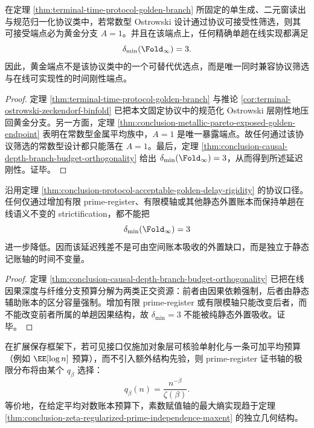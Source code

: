 \begin{theorem}[协议可接受设计的黄金端点延迟刚性]\label{thm:conclusion-protocol-acceptable-golden-delay-rigidity}
在定理 \ref{thm:terminal-time-protocol-golden-branch} 所固定的单生成、二元窗读出与规范归一化协议类中，若常数型 Ostrowski 设计通过协议可接受性筛选，则其可接受端点必为黄金分支 \(A=1\)。并且在该端点上，任何精确单趟在线实现都满足
\[
\delta_{\min}(\Fold_\infty)=3.
\]
因此，黄金端点不是该协议类中的一个可替代优选点，而是唯一同时兼容协议筛选与在线可实现性的时间刚性端点。
\end{theorem}
\begin{proof}
定理 \ref{thm:terminal-time-protocol-golden-branch} 与推论 \ref{cor:terminal-ostrowski-zeckendorf-binfold} 已把本文固定协议中的规范化 Ostrowski 层刚性地压回黄金分支。另一方面，定理 \ref{thm:conclusion-metallic-pareto-exposed-golden-endpoint} 表明在常数型金属平均族中，\(A=1\) 是唯一暴露端点。故任何通过该协议筛选的常数型设计都只能落在 \(A=1\)。最后，定理 \ref{thm:conclusion-causal-depth-branch-budget-orthogonality} 给出 \(\delta_{\min}(\Fold_\infty)=3\)，从而得到所述延迟刚性。证毕。
\end{proof}

\begin{corollary}[时间残差不能由静态账本吸收]\label{cor:conclusion-delay3-not-absorbable-by-static-ledger}
沿用定理 \ref{thm:conclusion-protocol-acceptable-golden-delay-rigidity} 的协议口径。任何仅通过增加有限 prime-register、有限模轴或其他静态外置账本而保持单趟在线语义不变的 strictification，都不能把
\[
\delta_{\min}(\Fold_\infty)=3
\]
进一步降低。因而该延迟残差不是可由空间账本吸收的外置缺口，而是独立于静态记账轴的时间不变量。
\end{corollary}
\begin{proof}
定理 \ref{thm:conclusion-causal-depth-branch-budget-orthogonality} 已把在线因果深度与纤维分支预算分解为两类正交资源：前者由因果依赖强制，后者由静态辅助账本的区分容量强制。增加有限 prime-register 或有限模轴只能改变后者，而不能改变前者所属的单趟因果结构，故 \(\delta_{\min}=3\) 不能被纯静态外置吸收。证毕。
\end{proof}

\begin{conjecture}[扩展保存下的最大熵证书选择律]\label{conj:conclusion-extension-preserving-maxent-zeta-selection}
在扩展保存框架下，若可见接口仅施加对象层可核验单射化与一条可加平均预算（例如 \(\EE[\log n]\) 预算），而不引入额外结构先验，则 prime-register 证书轴的极限分布将由某个 \(q_\beta\) 选择：
\[
q_\beta(n)=\frac{n^{-\beta}}{\zeta(\beta)}.
\]
等价地，在给定平均对数账本预算下，素数赋值轴的最大熵实现趋于定理 \ref{thm:conclusion-zeta-regularized-prime-independence-maxent} 的独立几何结构。
\end{conjecture}

